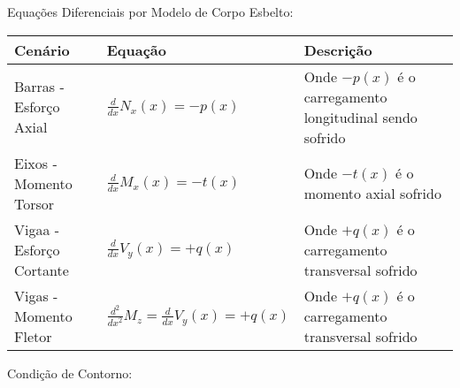 \documentclass{article}
\begin{document}
            Equações Diferenciais por Modelo de Corpo Esbelto:

            \begin{table}[h]\tiny
                
            \begin{tabularx}{\textwidth}{|X|X|X|}\hline
                    \textbf{Cenário} & \textbf{Equação} & \textbf{Descrição}\\ \hline
                    \rule{0pt}{4ex} Barras - Esforço Axial & $\frac{d}{dx}N_x(x) = -p(x)$ & Onde $-p(x)$ é o carregamento longitudinal sendo sofrido \\[2ex]  \hline
                    \rule{0pt}{4ex} Eixos - Momento Torsor   & $\frac{d}{dx}M_x(x) = -t(x)$ & Onde $-t(x)$ é o momento axial sofrido \\[2ex]\hline
                    \rule{0pt}{4ex} Vigaa - Esforço Cortante & $\frac{d}{dx}V_y(x) = +q(x)$ & Onde $+q(x)$ é o carregamento transversal sofrido \\[2ex] \hline
                    \rule{0pt}{4ex} Vigas - Momento Fletor & $\frac{d^2}{dx^2}M_z = \frac{d}{dx}V_y(x) = +q(x)$ & Onde $+q(x)$ é o carregamento transversal sofrido \\[2ex] \hline
            \end{tabularx}

            \end{table}
            Condição de Contorno:

            
\end{document}
